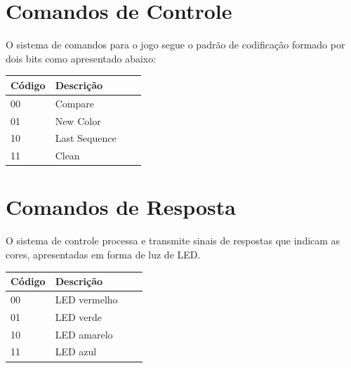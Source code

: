 \documentclass{report}
\begin{document}
    \section{Comandos de Controle}
    O sistema de comandos para o jogo segue o padrão de codificação formado por dois bits como apresentado abaixo:
    \begin{table}[H]
       \centering
        \begin{tabular}[pos]{|m{2cm} |m{2cm}| m{6cm} | m{3cm}|} 
         \hline
          \cellcolor[gray]{0.9}
           \textbf{Código} & \cellcolor[gray]{0.9} \textbf{Descrição} \\ \hline
                00 & Compare \\ \hline
                01 & New Color \\ \hline
                10 & Last Sequence \\ \hline
                11 & Clean \\ \hline
                
        \end{tabular}
       \end{table}
       
    \section{Comandos de Resposta}
    O sistema de controle processa e transmite sinais de respostas que indicam as cores, apresentadas em forma de luz de LED.
    \begin{table}[H]
       \centering
        \begin{tabular}[pos]{|m{2cm} |m{2cm}| m{6cm} | m{3cm}|} 
         \hline
          \cellcolor[gray]{0.9}
           \textbf{Código} & \cellcolor[gray]{0.9} \textbf{Descrição} \\ \hline
                00 & LED vermelho \\ \hline
                01 & LED verde \\ \hline
                10 & LED amarelo \\ \hline
                11 & LED azul \\ \hline
                
        \end{tabular}
       \end{table}
    



% 
% 
\end{document}
